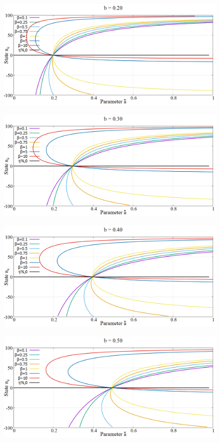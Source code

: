 \begin{figure}[h!]
 \centering
  \includegraphics[width=\linewidth]{images/appendix/phaseSpace/2.png}
\end{figure}

\begin{figure}[h!]
 \centering
  \includegraphics[width=\linewidth]{images/appendix/phaseSpace/3.png}
\end{figure}
\newpage
\begin{figure}[h!]
 \centering
  \includegraphics[width=\linewidth]{images/appendix/phaseSpace/4.png}
\end{figure}
\newpage
\begin{figure}[h!]
 \centering
  \includegraphics[width=\linewidth]{images/appendix/phaseSpace/5.png}
\end{figure}

